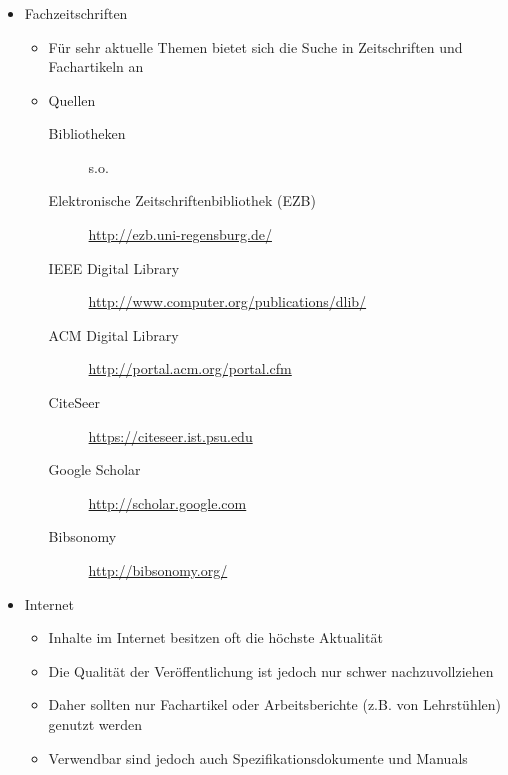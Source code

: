 \documentclass[aspectratio=169]{beamer}
\begin{document}
\begin{frame}
  \frametitle{\insertsection}%
  \framesubtitle{\insertsubsection}%
  \begin{itemize}
   \item Fachzeitschriften
   \begin{itemize}
    \item Für sehr aktuelle Themen bietet sich die Suche in Zeitschriften und Fachartikeln an
    \item Quellen
    \begin{description}
     \item[Bibliotheken] s.o.
     \item[Elektronische Zeitschriftenbibliothek (EZB)] \url{http://ezb.uni-regensburg.de/}
     \item[IEEE Digital Library] \url{http://www.computer.org/publications/dlib/}
     \item[ACM Digital Library] \url{http://portal.acm.org/portal.cfm}
     \item[CiteSeer] \url{https://citeseer.ist.psu.edu}
     \item[Google Scholar] \url{http://scholar.google.com}
     \item[Bibsonomy] \url{http://bibsonomy.org/}
    \end{description}
   \end{itemize}
   \item Internet
   \begin{itemize}
    \item Inhalte im Internet besitzen oft die höchste Aktualität
    \item Die Qualität der Veröffentlichung ist jedoch nur schwer nachzuvollziehen
    \item Daher sollten nur Fachartikel oder Arbeitsberichte (z.B. von Lehrstühlen) genutzt werden
    \item Verwendbar sind jedoch auch Spezifikationsdokumente und Manuals
   \end{itemize}
  \end{itemize}
\end{frame}
\end{document}

